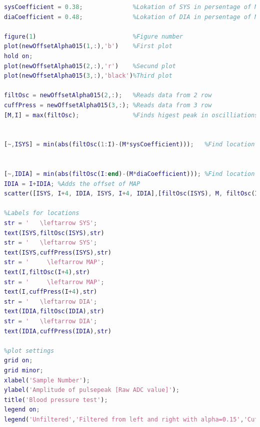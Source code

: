 \begin{lstlisting}[language=matlab]
sysCoefficient = 0.38;              %Lokation of SYS in persentage of MAP
diaCoefficient = 0.48;              %Lokation of DIA in persentage of MAP

figure(1)                           %Figure number
plot(newOffsetAlpha015(1,:),'b')    %First plot
hold on;
plot(newOffsetAlpha015(2,:),'r')    %Secund plot
plot(newOffsetAlpha015(3,:),'black')%Third plot

filtOsc = newOffsetAlpha015(2,:);   %Reads data from 2 row
cuffPress = newOffsetAlpha015(3,:); %Reads data from 3 row
[M,I] = max(filtOsc);               %Finds higest peak in oscilliations


[~,ISYS] = min(abs(filtOsc(1:I)-(M*sysCoefficient)));   %Find location of SYS


[~,IDIA] = min(abs(filtOsc(I:end)-(M*diaCoefficient))); %Find location of DIA
IDIA = I+IDIA; %Adds the offset of MAP
scatter([ISYS, I+4, IDIA, ISYS, I+4, IDIA],[filtOsc(ISYS), M, filtOsc(IDIA), cuffPress(ISYS), cuffPress(I+4), cuffPress(IDIA)],'or','LineWidth',5); %Plot SYS, MAP and DIA

%Labels for locations
str = '   \leftarrow SYS';
text(ISYS,filtOsc(ISYS),str)
str = '   \leftarrow SYS';
text(ISYS,cuffPress(ISYS),str)
str = '     \leftarrow MAP';
text(I,filtOsc(I+4),str)
str = '     \leftarrow MAP';
text(I,cuffPress(I+4),str)
str = '   \leftarrow DIA';
text(IDIA,filtOsc(IDIA),str)
str = '   \leftarrow DIA';
text(IDIA,cuffPress(IDIA),str)

%plot settings
grid on;
grid minor;
xlabel('Sample Number');
ylabel('Amplitude of pulsepeak [Raw ADC value]');
title('Blood pressure test');
legend on;
legend('Unfiltered','Filtered from left and right with alpha=0.15','Cuff pressure (not peak values)','SYS, MAP and DIA');
\end{lstlisting}


